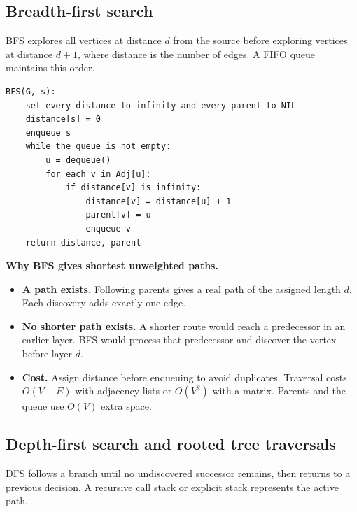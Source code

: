 \documentclass[12pt,a4paper]{article}
\begin{document}
\subsection{Breadth-first search}
\begin{tcolorbox}[defbox, title={Breadth-first search (BFS)}]
BFS explores all vertices at distance $d$ from the source before exploring vertices at distance $d+1$, where distance is the number of edges. A FIFO queue maintains this order.
\end{tcolorbox}

\begin{tcolorbox}[formulabox, title={BFS for unweighted shortest paths}]
\begin{verbatim}
BFS(G, s):
    set every distance to infinity and every parent to NIL
    distance[s] = 0
    enqueue s
    while the queue is not empty:
        u = dequeue()
        for each v in Adj[u]:
            if distance[v] is infinity:
                distance[v] = distance[u] + 1
                parent[v] = u
                enqueue v
    return distance, parent
\end{verbatim}
\end{tcolorbox}

\textbf{Why BFS gives shortest unweighted paths.}
\begin{itemize}[leftmargin=*, itemsep=2pt]
  \item \textbf{A path exists.} Following parents gives a real path of the assigned length $d$. Each discovery adds exactly one edge.
  \item \textbf{No shorter path exists.} A shorter route would reach a predecessor in an earlier layer. BFS would process that predecessor and discover the vertex before layer $d$.
  \item \textbf{Cost.} Assign distance before enqueuing to avoid duplicates. Traversal costs $O(V+E)$ with adjacency lists or $O(V^2)$ with a matrix. Parents and the queue use $O(V)$ extra space.
\end{itemize}

\subsection{Depth-first search and rooted tree traversals}
\begin{tcolorbox}[defbox, title={Depth-first search (DFS)}]
DFS follows a branch until no undiscovered successor remains, then returns to a previous decision. A recursive call stack or explicit stack represents the active path.
\end{tcolorbox}
\end{document}
